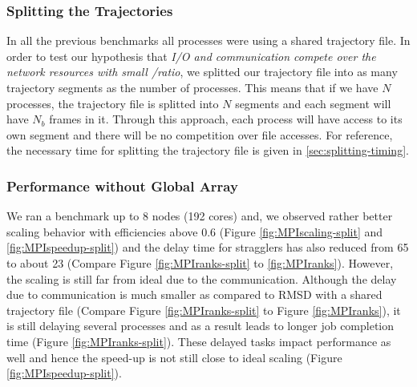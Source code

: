 \subsubsection{Splitting the Trajectories}
\label{Splitting}
In all the previous benchmarks all processes were using a shared trajectory file.
In order to test our hypothesis that \emph{I/O and communication compete over the network resources with small \tcomp/\tIO ratio}, we splitted our trajectory file into as many trajectory segments as the number of processes.
This means that if we have $N$ processes, the trajectory file is splitted into $N$ segments and each segment will have $N_{b}$ frames in it. 
Through this approach, each process will have access to its own segment and there will be no competition over file accesses. 
For reference, the necessary time for splitting the trajectory file is given in \ref{sec:splitting-timing}.

\subsubsection*{Performance without Global Array}
We ran a benchmark up to 8 nodes (192 cores) and, we observed rather better scaling behavior with efficiencies above 0.6 (Figure \ref{fig:MPIscaling-split} and \ref{fig:MPIspeedup-split}) and the delay time for stragglers has also reduced from 65 to about 23 (Compare Figure \ref{fig:MPIranks-split} to  \ref{fig:MPIranks}). 
However, the scaling is still far from ideal due to the communication. 
Although the delay due to communication is much smaller as compared to RMSD with a shared trajectory file (Compare Figure \ref{fig:MPIranks-split} to Figure \ref{fig:MPIranks}), it is still delaying several processes and as a result leads to longer job completion time (Figure \ref{fig:MPIranks-split}). 
These delayed tasks impact performance as well and hence the speed-up is not still close to ideal scaling (Figure \ref{fig:MPIspeedup-split}).

